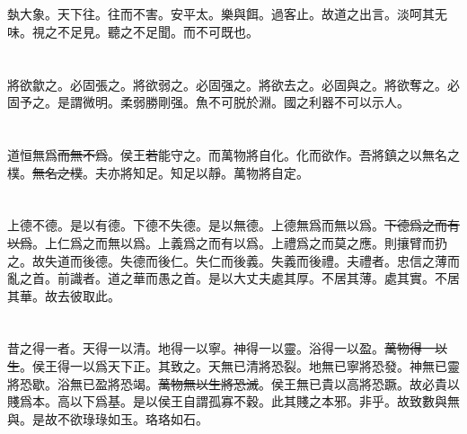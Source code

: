 \documentclass[a5paper]{ctexbook}
\newcommand{\bo}[1]{\textcolor[RGB]{0,255,255}{#1}}
\newcommand{\jian}[1]{\textcolor[RGB]{0,255,0}{#1}}
\def\del{\sout}
\begin{document}
    \chapter{}

    \jian{埶}大象。天下往。往而不害。安平太。樂與餌。過客止。\jian{故}道之出\bo{言}。淡呵其无味。視之不足見。聽之不足聞。\jian{而不可既也}。

    \chapter{}

    將欲歙之。必固張之。將欲弱之。必固强之。將欲\bo{去}之。必固\bo{與}之。將欲奪之。必固\bo{予}之。是謂微明。柔弱勝剛强。魚不可脱於淵。國之利器不可以示人。

    \chapter{}

    道\bo{恒}無爲\jian{\del{而無不爲}}。侯王\jian{\del{若}}能守之。\jian{而}萬物將自化。化而欲作。\jian{\del{吾}}將鎮之以無名之樸。\jian{\del{無名之樸}}。夫亦將\jian{知足}。\jian{知足}以靜。\jian{萬物}將自定。

    \chapter{}

    上德不德。是以有德。下德不失德。是以無德。上德無爲而無以爲。\bo{\del{下德爲之而有以爲}}。上仁爲之而無以爲。上義爲之而有以爲。上禮爲之而莫之應。則攘臂而扔之。故失道而後德。失德而後仁。失仁而後義。失義而後禮。夫禮者。忠信之薄而亂之首。前識者。道之華而愚之\bo{首}。是以大丈夫處其厚。不居其薄。處其實。不居其華。故去彼取此。

    \chapter{}

    昔之得一者。天得一以清。地得一以寧。神得一以靈。\bo{浴}得一以盈。\bo{\del{萬物得一以生}}。侯王得一以爲天下\bo{正}。其致之。天無\bo{已}清將恐裂。地無\bo{已}寧將恐發。神無\bo{已}靈將恐歇。\bo{浴}無\bo{已}盈將恐竭。\bo{\del{萬物無以生將恐滅}}。侯王無\bo{已}貴\bo{以}高將恐蹶。故\bo{必}貴以賤爲本。高以下爲基。是以侯王自謂孤寡不穀。此\bo{其賤之本}邪。非乎。故致數\bo{與}無\bo{與}。\bo{是故}不欲琭琭如玉。珞珞如石。

    \chapter{}
\end{document}
